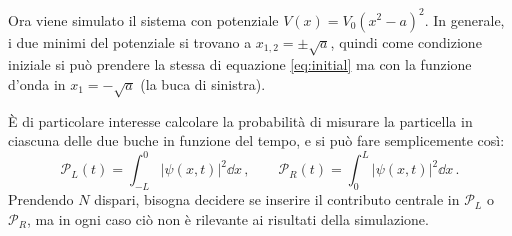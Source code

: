 \documentclass[a4paper, titlepage]{article}
\numberwithin{equation}{section}
\begin{document}
Ora viene simulato il sistema con potenziale $V(x) = V_0(x^2-a)^2$. In generale, i due minimi del potenziale si trovano a $x_{1,2} = \pm \sqrt{a}$, quindi come condizione iniziale si può prendere la stessa di equazione \eqref{eq:initial} ma con la funzione d'onda in $x_1 = -\sqrt{a}$ (la buca di sinistra). 

È di particolare interesse calcolare la probabilità di misurare la particella in ciascuna delle due buche in funzione del tempo, e si può fare semplicemente così:
\[
    \mathcal{P}_L(t) = \int_{-L}^0 |\psi(x,t)|^2 \dd x\, ,
    \qquad
    \mathcal{P}_R(t) = \int_0^L |\psi(x,t)|^2 \dd x\, .
\]
Prendendo $N$ dispari, bisogna decidere se inserire il contributo centrale in $\mathcal{P}_L$ o  $\mathcal{P}_R$, ma in ogni caso ciò non è rilevante ai risultati della simulazione. 
\end{document}
